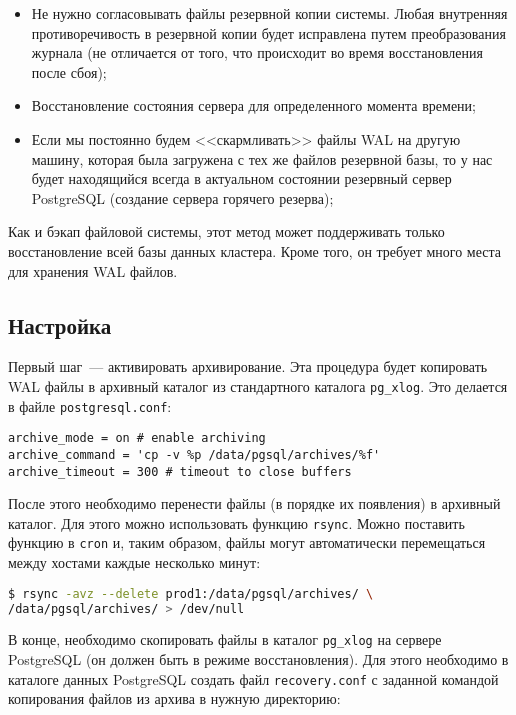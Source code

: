 \begin{itemize}
  \item Не нужно согласовывать файлы резервной копии системы. Любая внутренняя противоречивость в резервной копии будет исправлена путем преобразования журнала (не отличается от того, что происходит во время восстановления после сбоя);
  \item Восстановление состояния сервера для определенного момента времени;
  \item Если мы постоянно будем <<скармливать>> файлы WAL на другую машину, которая была загружена с тех же файлов резервной базы, то у нас будет находящийся всегда в актуальном состоянии резервный сервер PostgreSQL (создание сервера горячего резерва);
\end{itemize}

Как и бэкап файловой системы, этот метод может поддерживать только восстановление всей базы данных кластера. Кроме того, он требует много места для хранения WAL файлов.

\subsection{Настройка}

Первый шаг~--- активировать архивирование. Эта процедура будет копировать WAL файлы в архивный каталог из стандартного каталога \lstinline!pg_xlog!. Это делается в файле \lstinline!postgresql.conf!:

\begin{lstlisting}[label=lst:backups15,caption=Настройка архивирования]
archive_mode = on # enable archiving
archive_command = 'cp -v %p /data/pgsql/archives/%f'
archive_timeout = 300 # timeout to close buffers
\end{lstlisting}

После этого необходимо перенести файлы (в порядке их появления) в архивный каталог. Для этого можно использовать функцию \lstinline!rsync!. Можно поставить функцию в \lstinline!cron! и, таким образом, файлы могут автоматически перемещаться между хостами каждые несколько минут:

\begin{lstlisting}[language=Bash,label=lst:backups16,caption=Копирование WAL файлов на другой хост]
$ rsync -avz --delete prod1:/data/pgsql/archives/ \
/data/pgsql/archives/ > /dev/null
\end{lstlisting}

В конце, необходимо скопировать файлы в каталог \lstinline!pg_xlog! на сервере PostgreSQL (он должен быть в режиме восстановления). Для этого необходимо в каталоге данных PostgreSQL создать файл \lstinline!recovery.conf! с заданной командой копирования файлов из архива в нужную директорию:

